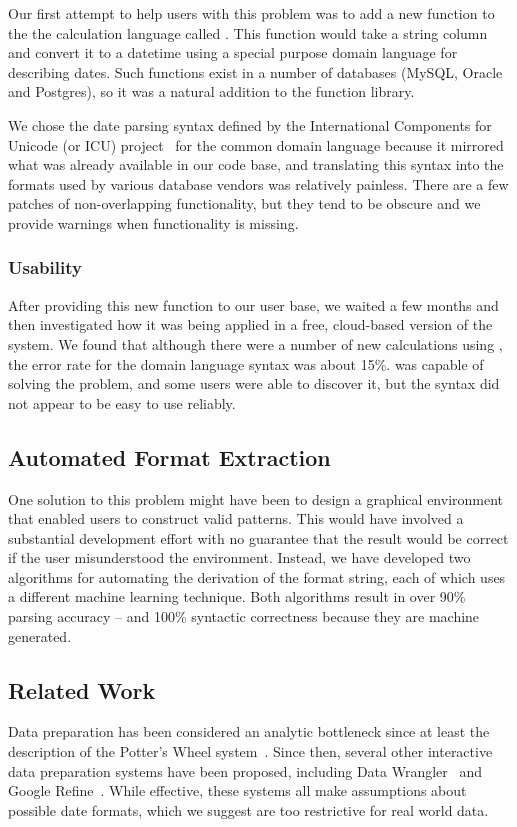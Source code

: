 Our first attempt to help users with this problem was to add a new function to the the calculation language called \dateparse. This function would take a string column and convert it to a datetime using a special purpose domain language for describing dates. Such functions exist in a number of databases (\eg MySQL, Oracle and Postgres), so it was a natural addition to the function library.

We chose the date parsing syntax defined by the International Components for Unicode (or ICU) project~\cite{ICU} for the common domain language because it mirrored what was already available in our code base, and translating this syntax into the formats used by various database vendors was relatively painless. There are a few patches of non-overlapping functionality, but they tend to be obscure and we provide warnings when functionality is missing.

\subsubsection{	Usability}
After providing this new function to our user base, we waited a few months and then investigated how it was being applied in a free, cloud-based version of the system. We found that although there were a number of new calculations using \dateparse, the error rate for the domain language syntax was about 15\%. \dateparse was capable of solving the problem, and some users were able to discover it, but the syntax did not appear to be easy to use reliably.

\subsection{Automated Format Extraction}
One solution to this problem might have been to design a graphical environment that enabled users to construct valid patterns. This would have involved a substantial development effort with no guarantee that the result would be correct if the user misunderstood the environment. Instead, we have developed two algorithms for automating the derivation of the format string, each of which uses a different machine learning technique. Both algorithms result in over 90\% parsing accuracy -- and 100\% syntactic correctness because they are machine generated.


\subsection{Related Work}
Data preparation has been considered an analytic bottleneck since at least the description of the Potter's Wheel system~\cite{Raman:2001}. Since then, several other interactive data preparation systems have been proposed, including Data Wrangler~\cite{Kandel:2011} and Google Refine~\cite{Refine}. While effective, these systems all make assumptions about possible date formats, which we suggest are too restrictive for real world data.

